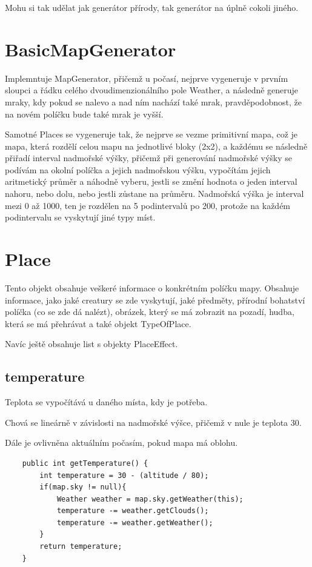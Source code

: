 \documentclass[12pt,a4paper]{report}
\begin{document}
Mohu si tak udělat jak generátor přírody, tak generátor na úplně cokoli jiného.

\section{BasicMapGenerator}
Implemntuje MapGenerator, přičemž u počasí, nejprve vygeneruje v prvním sloupci a řádku celého dvoudimenzionálního pole Weather, a následně generuje mraky, kdy pokud se nalevo a nad ním nachází také mrak, pravděpodobnost, že na novém políčku bude také mrak je vyšší.

Samotné Places se vygeneruje tak, že nejprve se vezme primitivní mapa, což je mapa, která rozdělí celou mapu na jednotlivé bloky (2x2), a každému se následně přiřadí interval nadmořské výšky, přičemž při generování nadmořské výšky se podívám na okolní políčka a jejich nadmořskou výšku, vypočítám jejich aritmetický průměr a náhodně vyberu, jestli se změní hodnota o jeden interval nahoru, nebo dolu, nebo jestli zůstane na průměru. Nadmořská výška je interval mezi 0 až 1000, ten je rozdělen na 5 podintervalů po 200, protože na každém podintervalu se vyskytují jiné typy míst. 

\section{Place}

Tento objekt obsahuje veškeré informace o konkrétním políčku mapy. Obsahuje informace, jako jaké creatury se zde vyskytují, jaké předměty, přírodní bohatství políčka (co se zde dá nalézt), obrázek, který se má zobrazit na pozadí, hudba, která se má přehrávat a také objekt TypeOfPlace.

Navíc ještě obsahuje list s objekty PlaceEffect.
\subsection{temperature}
Teplota se vypočítává u daného místa, kdy je potřeba.

Chová se lineárně v závislosti na nadmořské výšce, přičemž v nule je teplota 30.

Dále je ovlivněna aktuálním počasím, pokud mapa má oblohu.

\begin{verbatim}
    public int getTemperature() {
        int temperature = 30 - (altitude / 80);
        if(map.sky != null){
            Weather weather = map.sky.getWeather(this);
            temperature -= weather.getClouds();
            temperature -= weather.getWeather();
        }
        return temperature;
    }
\end{verbatim}
\end{document}
